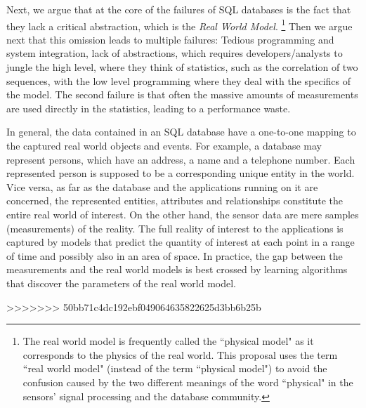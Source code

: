Next, we argue that at the core of the failures of SQL databases is the fact that they lack a critical abstraction, which is the {\em Real World Model}.%
\footnote{The real world model is frequently called the ``physical model" as it corresponds to the physics of the real world. This proposal uses the term ``real world model" (instead of the term ``physical model") to avoid the confusion caused by the two different meanings of the word ``physical" in the sensors' signal processing and the database community.
}
Then we argue next that this omission leads to multiple failures: Tedious programming and system integration, lack of abstractions, which requires developers/analysts to jungle the high level, where they think of statistics, such as the correlation of two sequences, with the low level programming where they deal with the specifics of the model. The second failure is that often the massive amounts of measurements are used directly in the statistics, leading to a performance waste.

In general, the data contained in an SQL database have a one-to-one mapping to the captured real world objects and events. For example, a database may represent persons, which have an address, a name and a telephone number. Each represented person is supposed to be a corresponding unique entity in the world. Vice versa, as far as the database and the applications running on it are concerned, the represented entities, attributes and relationships constitute the entire real world of interest. On the other hand, the sensor data are mere samples (measurements) of the reality. The full reality of interest to the applications is captured by models that predict the quantity of interest at each point in a range of time and possibly also in an area of space. In practice, the gap between the measurements and the real world models is best crossed by learning algorithms that discover the parameters of the real world model. 

>>>>>>> 50bb71c4dc192ebf049064635822625d3bb6b25b


